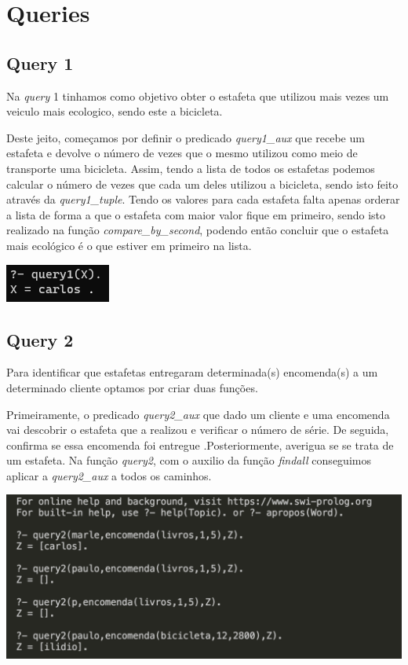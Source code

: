 \documentclass[a4paper,12pt]{article}
\begin{document}
\section{Queries}
    
    \subsection{Query 1}
        Na \emph{query} 1 tinhamos como objetivo obter o estafeta que utilizou mais vezes um veiculo mais ecologico, sendo este a bicicleta.\par
        Deste jeito, começamos por definir o predicado \emph{query1\_aux} que recebe um estafeta e devolve o número de vezes que o mesmo utilizou como meio de transporte uma bicicleta. Assim, tendo a lista de todos os estafetas podemos calcular o número de vezes que cada um deles utilizou a bicicleta, sendo isto feito através da \emph{query1\_tuple}. Tendo os valores para cada estafeta falta apenas orderar a lista de forma a que o estafeta com maior valor fique em primeiro, sendo isto realizado na função \emph{compare\_by\_second}, podendo então concluir que o estafeta mais ecológico é o que estiver em primeiro na lista.
    
        \begin{center}
            \includegraphics[scale=1]{imagens/query1.png}
        \end{center}
        
    \subsection{Query 2}
        Para identificar que estafetas entregaram determinada(s) encomenda(s) a um determinado cliente optamos por criar duas funções.\par
        Primeiramente, o predicado \emph{query2\_aux} que dado um cliente e uma encomenda vai descobrir o estafeta que a realizou e verificar o número de série. De seguida, confirma se essa encomenda foi entregue .Posteriormente, averigua se se trata de um estafeta. Na função  \emph{query2}, com o auxilio da função \emph{findall} conseguimos aplicar a \emph{query2\_aux} a todos os caminhos.\par
        
        \begin{center}
            \includegraphics[scale=0.6]{imagens/query2.png}
        \end{center}
    
\end{document}
